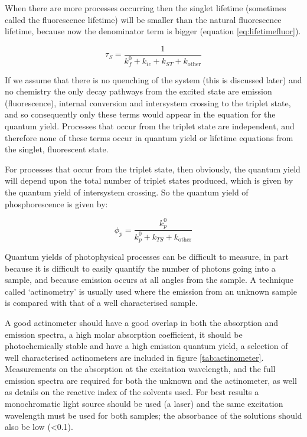 \documentclass[
]{book}
\begin{document}
When there are more processes occurring then the singlet lifetime (sometimes called the fluorescence lifetime) will be smaller than the natural fluorescence lifetime, because now the denominator term is bigger (equation \eqref{eq:lifetimefluor}).

\begin{equation}
\tau_S = \frac{1}{k_f^0+k_{ic}+ k_{ST}+k_{\textrm{other}}}
\label{eq:lifetimefluor}
\end{equation}

If we assume that there is no quenching of the system (this is discussed later) and no chemistry the only decay pathways from the excited state are emission (fluorescence), internal conversion and intersystem crossing to the triplet state, and so consequently only these terms would appear in the equation for the quantum yield. Processes that occur from the triplet state are independent, and therefore none of these terms occur in quantum yield or lifetime equations from the singlet, fluorescent state.

For processes that occur from the triplet state, then obviously, the quantum yield will depend upon the total number of triplet states produced, which is given by the quantum yield of intersystem crossing. So the quantum yield of phosphorescence is given by:

\begin{equation}
\phi_p = \frac{k_p^0}{k_p^0+k_{TS}+k_{\textrm{other}}}
\label{eq:QYphos}
\end{equation}

Quantum yields of photophysical processes can be difficult to measure, in part because it is difficult to easily quantify the number of photons going into a sample, and because emission occurs at all angles from the sample. A technique called `actinometry' is usually used where the emission from an unknown sample is compared with that of a well characterised sample.

A good actinometer should have a good overlap in both the absorption and emission spectra, a high molar absorption coefficient, it should be photochemically stable and have a high emission quantum yield, a selection of well characterised actinometers are included in figure \ref{tab:actinometer}. Measurements on the absorption at the excitation wavelength, and the full emission spectra are required for both the unknown and the actinometer, as well as details on the reactive index of the solvents used. For best results a monochromatic light source should be used (a laser) and the same excitation wavelength must be used for both samples; the absorbance of the solutions should also be low (\textless0.1).
\end{document}

